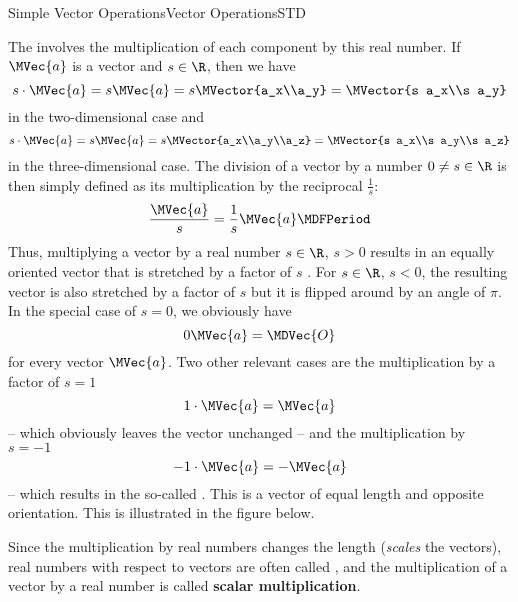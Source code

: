 \begin{MXContent}{Simple Vector Operations}{Vector Operations}{STD}
\begin{MInfo}
The  involves
the multiplication of each component by this real number. If $\MVec{a}$ is a vector and $s\in\R$, then we have
\[
 s\cdot\MVec{a} = s\MVec{a}=s\MVector{a_x\\a_y} = \MVector{s a_x\\s a_y}
\]
in the two-dimensional case and
\[
 s\cdot\MVec{a} = s\MVec{a}=s\MVector{a_x\\a_y\\a_z} = \MVector{s a_x\\s a_y\\s a_z}
\]
in the three-dimensional case. The division of a vector by a number $0\neq s\in\R$ is then simply defined as its multiplication
by the reciprocal $\frac{1}{s}$:
\[
 \frac{\MVec{a}}{s}=\frac{1}{s}\MVec{a}\MDFPeriod 
\]
Thus, multiplying a vector by a real number $s\in\R$, $s>0$ results in an equally oriented vector that is stretched by a factor 
of $s$ . For $s\in\R$, $s<0$, the resulting vector is also stretched by a factor of $s$ but it is flipped around by an angle of $\pi$.
In the special case of $s=0$, we obviously have \[0\MVec{a}=\MDVec{O}\] for every vector $\MVec{a}$. Two other relevant cases are the multiplication by a factor of $s=1$
\[1\cdot\MVec{a}=\MVec{a}\]
 -- which obviously leaves the vector unchanged -- and the multiplication by $s=-1$
\[-1\cdot\MVec{a}=-\MVec{a}\]
 -- which results in the so-called . This is a vector of 
equal length and opposite orientation. This is illustrated in the figure below.
\begin{center}
% 
\end{center}
Since the multiplication by real numbers changes the length (\textit{scales}
the vectors), real numbers with respect to vectors are often called , and the 
multiplication of a vector by a real number is called \textbf{scalar multiplication}. 
\end{MInfo}


\end{MXContent}
